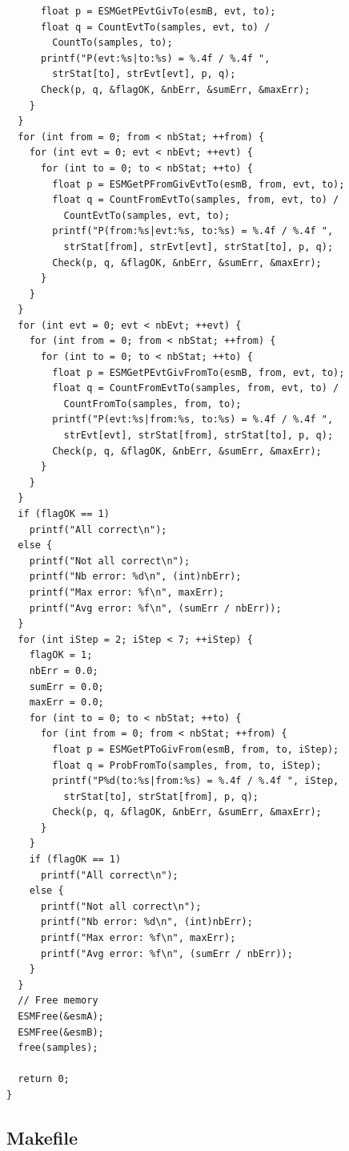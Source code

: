 \documentclass[12pt, a4paper]{article}
\begin{document}
\begin{scriptsize}
\begin{ttfamily}
\begin{lstlisting}
      float p = ESMGetPEvtGivTo(esmB, evt, to);
      float q = CountEvtTo(samples, evt, to) / 
        CountTo(samples, to);
      printf("P(evt:%s|to:%s) = %.4f / %.4f ", 
        strStat[to], strEvt[evt], p, q);
      Check(p, q, &flagOK, &nbErr, &sumErr, &maxErr);
    }
  }
  for (int from = 0; from < nbStat; ++from) {
    for (int evt = 0; evt < nbEvt; ++evt) {
      for (int to = 0; to < nbStat; ++to) {
        float p = ESMGetPFromGivEvtTo(esmB, from, evt, to);
        float q = CountFromEvtTo(samples, from, evt, to) / 
          CountEvtTo(samples, evt, to);
        printf("P(from:%s|evt:%s, to:%s) = %.4f / %.4f ", 
          strStat[from], strEvt[evt], strStat[to], p, q);
        Check(p, q, &flagOK, &nbErr, &sumErr, &maxErr);
      }
    }
  }
  for (int evt = 0; evt < nbEvt; ++evt) {
    for (int from = 0; from < nbStat; ++from) {
      for (int to = 0; to < nbStat; ++to) {
        float p = ESMGetPEvtGivFromTo(esmB, from, evt, to);
        float q = CountFromEvtTo(samples, from, evt, to) / 
          CountFromTo(samples, from, to);
        printf("P(evt:%s|from:%s, to:%s) = %.4f / %.4f ", 
          strEvt[evt], strStat[from], strStat[to], p, q);
        Check(p, q, &flagOK, &nbErr, &sumErr, &maxErr);
      }
    }
  }
  if (flagOK == 1)
    printf("All correct\n");
  else {
    printf("Not all correct\n");
    printf("Nb error: %d\n", (int)nbErr);
    printf("Max error: %f\n", maxErr);
    printf("Avg error: %f\n", (sumErr / nbErr));
  }
  for (int iStep = 2; iStep < 7; ++iStep) {
    flagOK = 1;
    nbErr = 0.0;
    sumErr = 0.0;
    maxErr = 0.0;
    for (int to = 0; to < nbStat; ++to) {
      for (int from = 0; from < nbStat; ++from) {
        float p = ESMGetPToGivFrom(esmB, from, to, iStep);
        float q = ProbFromTo(samples, from, to, iStep);
        printf("P%d(to:%s|from:%s) = %.4f / %.4f ", iStep,
          strStat[to], strStat[from], p, q);
        Check(p, q, &flagOK, &nbErr, &sumErr, &maxErr);
      }
    }
    if (flagOK == 1)
      printf("All correct\n");
    else {
      printf("Not all correct\n");
      printf("Nb error: %d\n", (int)nbErr);
      printf("Max error: %f\n", maxErr);
      printf("Avg error: %f\n", (sumErr / nbErr));
    }
  }
  // Free memory
  ESMFree(&esmA);
  ESMFree(&esmB);
  free(samples);
  
  return 0;
}
\end{lstlisting}
\end{ttfamily}
\end{scriptsize}

\subsection{Makefile}
\end{document}
